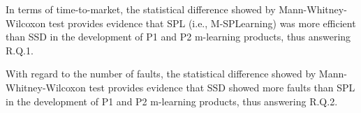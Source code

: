 \begin{table}[!ht]
\end{table}

In terms of time-to-market, the statistical difference showed by Mann-Whitney-Wilcoxon test provides evidence that SPL (i.e., M-SPLearning) was more efficient than SSD in the development of P1 and P2 m-learning products, thus answering R.Q.1. %

With regard to the number of faults, the statistical difference showed by Mann-Whitney-Wilcoxon test provides evidence that SSD showed more faults than SPL in the development of P1 and P2 m-learning products, thus answering R.Q.2. %

